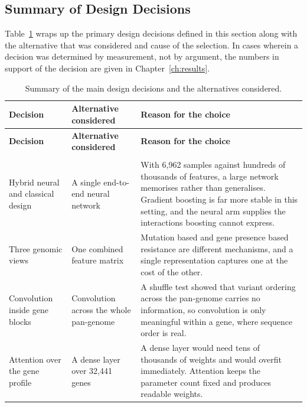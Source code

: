 \FloatBarrier
\subsection{Summary of Design Decisions}

Table~\ref{tab:designchoices} wraps up the primary design decisions defined in this section
along with the alternative that was considered and cause of the selection. In cases wherein a
decision was determined by measurement, not by argument, the numbers in support of the
decision are given in Chapter~\ref{ch:results}.

{\small\setlength{\tabcolsep}{5pt}
\begin{longtable}{|>{\raggedright\arraybackslash}p{2.9cm}|>{\raggedright\arraybackslash}p{3.1cm}|>{\raggedright\arraybackslash}p{7.5cm}|}
\caption{Summary of the main design decisions and the alternatives considered.}
\label{tab:designchoices}\\
\hline
\textbf{Decision} & \textbf{Alternative considered} & \textbf{Reason for the choice} \\
\hline
\endfirsthead
\hline
\textbf{Decision} & \textbf{Alternative considered} & \textbf{Reason for the choice} \\
\hline
\endhead
\hline
\multicolumn{3}{r}{\footnotesize\textit{Continued on the next page}}\\
\endfoot
\hline
\endlastfoot
Hybrid neural and classical design & A single end-to-end neural network &
With 6{,}962 samples against hundreds of thousands of features, a large network memorises
rather than generalises. Gradient boosting is far more stable in this setting, and the neural
arm supplies the interactions boosting cannot express. \\ \hline
Three genomic views & One combined feature matrix &
Mutation based and gene presence based resistance are different mechanisms, and a single
representation captures one at the cost of the other. \\ \hline
Convolution inside gene blocks & Convolution across the whole pan-genome &
A shuffle test showed that variant ordering across the pan-genome carries no information, so
convolution is only meaningful within a gene, where sequence order is real. \\ \hline
Attention over the gene profile & A dense layer over 32{,}441 genes &
A dense layer would need tens of thousands of weights and would overfit immediately.
Attention keeps the parameter count fixed and produces readable weights. \\ \hline

\end{longtable}}
